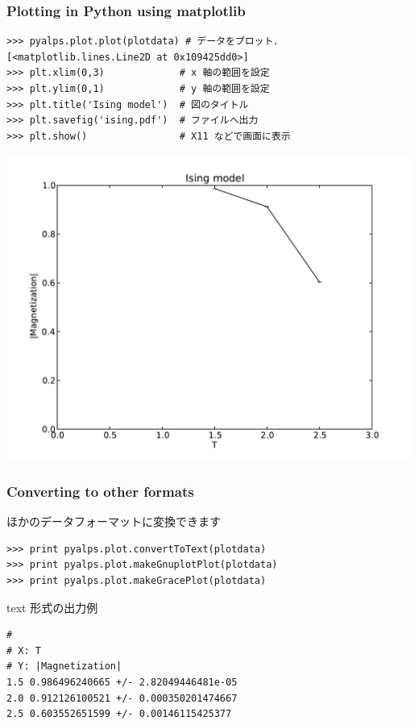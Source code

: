 \begin{frame}[t,fragile]
\frametitle{Plotting in Python using matplotlib}
\begin{lstlisting}
>>> pyalps.plot.plot(plotdata) # データをプロット．
[<matplotlib.lines.Line2D at 0x109425dd0>]
>>> plt.xlim(0,3)             # x 軸の範囲を設定
>>> plt.ylim(0,1)             # y 軸の範囲を設定
>>> plt.title('Ising model')  # 図のタイトル
>>> plt.savefig('ising.pdf')  # ファイルへ出力
>>> plt.show()                # X11 などで画面に表示
\end{lstlisting}
\includegraphics[scale=0.2]{ising.pdf}
\end{frame}

\begin{frame}[t,fragile]
\frametitle{Converting to other formats}
ほかのデータフォーマットに変換できます
\begin{lstlisting}
>>> print pyalps.plot.convertToText(plotdata)
>>> print pyalps.plot.makeGnuplotPlot(plotdata)
>>> print pyalps.plot.makeGracePlot(plotdata)
\end{lstlisting}

text 形式の出力例
\begin{lstlisting}
# 
# X: T
# Y: |Magnetization|
1.5	0.986496240665 +/- 2.82049446481e-05
2.0	0.912126100521 +/- 0.000350201474667
2.5	0.603552651599 +/- 0.00146115425377
\end{lstlisting}

\end{frame}

